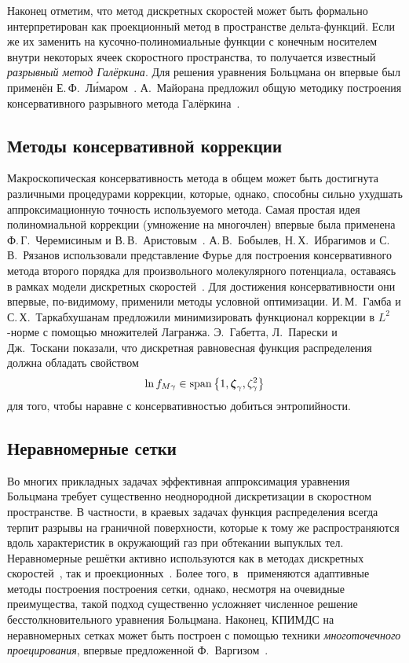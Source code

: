 Наконец отметим, что метод дискретных скоростей может быть формально интерпретирован
как проекционный метод в пространстве дельта-функций.
Если же их заменить на кусочно-полиномиальные функции с конечным носителем внутри некоторых ячеек скоростного пространства,
то получается известный \emph{разрывный метод Галёркина}.
Для решения уравнения Больцмана он впервые был применён Е.\,Ф.~Л\'{и}маром~\cite{Limar1973}.
А.~Майорана предложил общую методику построения консервативного разрывного метода Галёркина~\cite{Majorana2011}.

\subsection{Методы консервативной коррекции}

Макроскопическая консервативность метода в общем может быть достигнута различными процедурами коррекции,
которые, однако, способны сильно ухудшать аппроксимационную точность используемого метода.
Самая простая идея полиномиальной коррекции (умножение на многочлен) впервые была применена
Ф.\,Г.~Черемисиным и В.\,В.~Аристовым~\cite{Tcheremissine1970}.
А.\,В.~Бобылев, Н.\,Х.~Ибрагимов и С.\,В.~Рязанов использовали представление Фурье
для построения консервативного метода второго порядка для произвольного молекулярного потенциала,
оставаясь в рамках модели дискретных скоростей~\cite{Rjasanow1999, Ibragimov2002}.
Для достижения консервативности они впервые, по-видимому, применили методы условной оптимизации.
И.\,М.~Гамба и С.\,Х.~Таркабхушанам предложили минимизировать функционал коррекции
в \(L^2\)-норме с помощью множителей Лагранжа.
Э.~Габетта, Л.~Парески и Дж.~Тоскани показали, что дискретная равновесная функция распределения
должна обладать свойством~\cite{Gabetta1997}
\begin{equation}\label{eq:dicrete_equilibrium}
    \ln f_{M\gamma} \in \operatorname{span}\left\{ 1, {\boldsymbol{\zeta}}_\gamma, \zeta^2_\gamma \right\}
\end{equation}
для того, чтобы наравне с консервативностью добиться энтропийности.

\subsection{Неравномерные сетки}

Во многих прикладных задачах эффективная аппроксимация уравнения Больцмана
требует существенно неоднородной дискретизации в скоростном пространстве.
В частности, в краевых задачах функция распределения всегда терпит разрывы на граничной поверхности,
которые к тому же распространяются вдоль характеристик в окружающий газ при обтекании выпуклых тел.
Неравномерные решётки активно используются как в методах дискретных скоростей~\cite{Kolobov2011, Morris2012},
так и проекционных~\cite{Heintz2008, Wu2014}.
Более того, в~\cite{Kolobov2011, Kolobov2013} применяются адаптивные методы построения построения сетки,
однако, несмотря на очевидные преимущества, такой подход существенно усложняет численное решение
бесстолкновительного уравнения Больцмана.
Наконец, КПИМДС на неравномерных сетках может быть построен с помощью техники \emph{многоточечного проецирования},
впервые предложенной Ф.~Варгизом~\cite{Varghese2007}.

